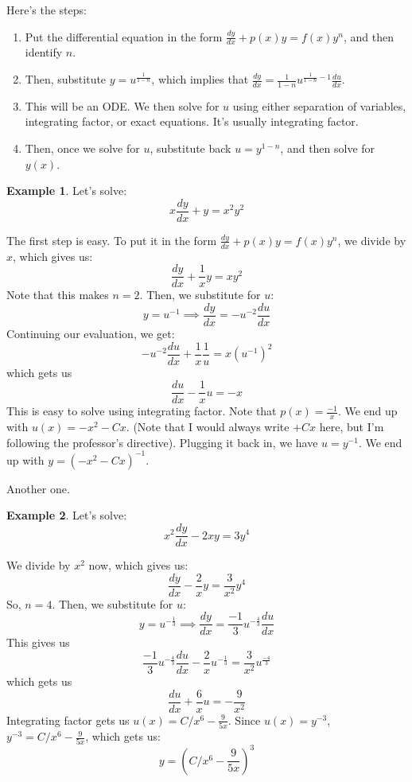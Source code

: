 \documentclass[10pt, oneside]{article}
\theoremstyle{definition}
\newtheorem{example}{Example}[section]
\begin{document}
Here's the steps:
\begin{enumerate}
    \item Put the differential equation in the form $\frac{dy}{dx} + p(x)y = f(x)y^n$, and then identify $n$.
    \item Then, substitute $y = u^\frac{1}{1-n}$, which implies that $\frac{dy}{dx}=\frac{1}{1-n}u^{\frac{1}{1-n}-1}\frac{du}{dx}$.
    \item This will be an ODE. We then solve for $u$ using either separation of variables, integrating factor, or exact equations. It's usually integrating factor. 
    \item Then, once we solve for $u$, substitute back $u = y^{1-n}$, and then solve for $y(x)$. 
\end{enumerate}
\begin{example}
    Let's solve:
    \[ 
    x\frac{dy}{dx} + y = x^2y^2
    \]

    The first step is easy. To put it in the form $\frac{dy}{dx} + p(x)y = f(x)y^n$, we divide by $x$, which gives us:
    \[
    \frac{dy}{dx} + \frac{1}{x}y = xy^2
    \]
    Note that this makes $n=2$. Then, we substitute for $u$:
    \[ 
    y = u^{-1} \implies \frac{dy}{dx} = -u^{-2}\frac{du}{dx}
    \]
    Continuing our evaluation, we get:
    \[
    -u^{-2}\frac{du}{dx} + \frac{1}{x}\frac{1}{u} = x(u^{-1})^2
    \]
    which gets us
    \[\frac{du}{dx} - \frac{1}{x}u = -x \]
    This is easy to solve using integrating factor. Note that $p(x) = \frac{-1}{x}$. We end up with $u(x) = -x^2 - Cx$. (Note that I would always write $+Cx$ here, but I'm following the professor's directive).
    Plugging it back in, we have $u = y^{-1}$. We end up with $y = ({-x^2-Cx})^{-1}$.
\end{example}
Another one.
\begin{example}
    Let's solve:
    \[ 
    x^2\frac{dy}{dx} - 2xy = 3y^4
    \]

    We divide by $x^2$ now, which gives us:
    \[
    \frac{dy}{dx} - \frac{2}{x}y = \frac{3}{x^2}y^4
    \]
    So, $n=4$. Then, we substitute for $u$:
    \[ 
    y = u^{-\frac{1}{3}} \implies \frac{dy}{dx} = \frac{-1}{3}u^{-\frac{4}{3}}\frac{du}{dx}
    \]
    This gives us
    \[
    \frac{-1}{3}u^{-\frac{4}{3}}\frac{du}{dx} - \frac{2}{x}u^{-\frac{1}{3}} = \frac{3}{x^2}u^\frac{-4}{3}
    \]
    which gets us
    \[\frac{du}{dx} + \frac{6}{x}u = -\frac{9}{x^2} \]
    Integrating factor gets us $u(x) = C/x^6 - \frac{9}{5x}$. Since $u(x) = y^{-3}$, $y^{-3} = C/x^6 - \frac{9}{5x}$, which gets us:
    \[ 
    y = (C/x^6 - \frac{9}{5x})^3
    \]
\end{example}
\end{document}

